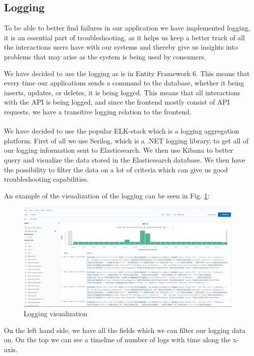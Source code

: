 \documentclass[10pt]{article}
\begin{document}
\subsection{Logging}
To be able to better find failures in our application we have implemented logging, it is an essential part of troubleshooting, as it helps us keep a better track of all the interactions users have with our systems and thereby give us insights into problems that may arise as the system is being used by consumers.

We have decided to use the logging as is in Entity Framework 6. This means that every time our applications sends a command to the database, whether it being inserts, updates, or deletes, it is being logged. This means that all interactions with the API is being logged, and since the frontend mostly consist of API requests, we have a transitive logging relation to the frontend.    
\\
\\
We have decided to use the popular ELK-stack which is a logging aggregation platform. First of all we use Serilog, which is a .NET logging library, to get all of our logging information sent to Elasticsearch. We then use Kibana to better query and visualize the data stored in the Elasticsearch database. We then have the possibility to filter the data on a lot of criteria which can give us good troubleshooting capabilities.

An example of the visualization of the logging can be seen in Fig. \ref{fig:logging_visualization}:
\begin{figure}[h]
    \centering
    \includegraphics[width=\textwidth]{images/loggingvisualization.PNG}
    \caption{Logging visualization}
    \label{fig:logging_visualization}
\end{figure}
On the left hand side, we have all the fields which we can filter our logging data on.
On the top we can see a timeline of number of logs with time along the x-axis.
\end{document}
